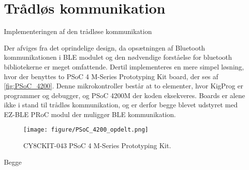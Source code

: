 \section{Trådløs kommunikation}
Implementeringen af den trådløse kommunikation 

Der afviges fra det oprindelige design, da opsætningen af Bluetooth kommunikationen i BLE modulet og den nødvendige forståelse for bluetooth bibliotekerne er meget omfattende. Dertil implementeres en mere simpel løsning, hvor der benyttes to PSoC 4 M-Series Prototyping Kit board, der ses af \autoref{fig:PSoC_4200}. Denne mikrokontroller består at to elementer, hvor KigProg er programmer og debugger, og PSoC 4200M der koden eksekveres. 
Boards er alene ikke i stand til trådløs kommunikation, og er derfor begge blevet udstyret med EZ-BLE PRoC modul der muliggør BLE kommunikation.

\begin{figure}[H]
	\centering
	\texttt{[image: figure/PSoC\_4200\_opdelt.png]}
	\caption{CY8CKIT-043 PSoC 4 M-Series Prototyping Kit\citep{cypress42015}.}
	\label{fig:PSoC_4200}
\end{figure}

Begge 